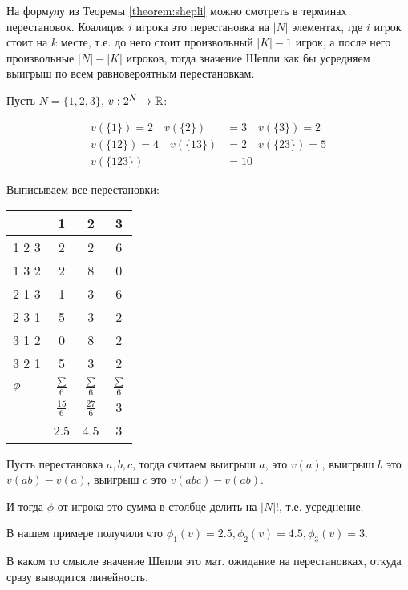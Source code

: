 \documentclass[../main.tex]{subfiles}
\begin{document}
На формулу из Теоремы \ref{theorem:shepli} можно смотреть в терминах перестановок.
Коалиция $i$ игрока это перестановка на  $|N|$ элементах, где  $i$ игрок стоит на  $k$ месте, т.е. до него стоит произвольный  $|K| - 1$ игрок, а после него произвольные $|N| - |K|$ игроков, тогда значение Шепли как бы усредняем выигрыш по всем равновероятным перестановкам.


 \begin{exmpl}
	 Пусть $N = \{1, 2, 3\}$,  $v : 2^{N} \to \mathbb{R}$:

	 \begin{align*}
		 v(\{1\}) = 2 \quad v(\{2\}) &= 3 \quad v(\{3\}) = 2 \\
		 v(\{12\}) = 4 \quad v(\{13\}) &= 2 \quad v(\{23\}) = 5 \\
		 v(\{123\}) &= 10
 	 \end{align*}

	 Выписываем все перестановки:


		{ \centering
\renewcommand{\arraystretch}{1.3}
			\begin{tabular}{l|ccc}
			  & 1 & 2 & 3\\
			  \hline
				1 2 3  & 2 & 2 & 6 \\
				1 3 2 & 2 & 8 & 0 \\
				2 1 3 & 1 & 3 &  6\\
				2 3 1 & 5 & 3 & 2\\
				3 1 2 & 0 & 8 & 2 \\
				3 2 1 & 5 & 3 & 2 \\
				$\phi$ &  $\frac{\sum}{6}$ & $\frac{\sum}{6}$ & $\frac{\sum}{6}$ \\
					   & $\frac{15}{6}$ & $\frac{27}{6}$ & $3$ \\
					   & 2.5 & 4.5 & 3
			\end{tabular}\par
		}

		Пусть перестановка $a, b, c$, тогда считаем выигрыш  $a$, это $v(a)$, выигрыш  $b$ это  $v(ab) - v(a)$, выигрыш  $c$ это  $v(abc) - v(ab)$. 

		И тогда $\phi$ от игрока это сумма в столбце делить на  $|N|!$, т.е. усреднение.

		В нашем примере получили что $\phi_1(v) = 2.5, \phi_2(v) = 4.5, \phi_3(v) = 3$.

		В каком то смысле значение Шепли это мат. ожидание на перестановках, откуда сразу выводится линейность.

	 
\end{exmpl}
\end{document}
